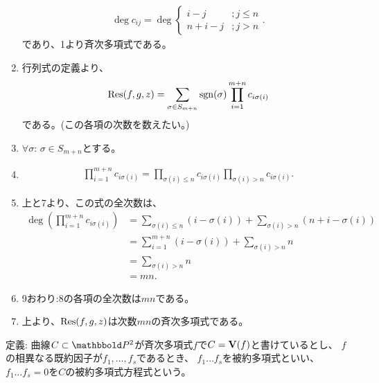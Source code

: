 \begin{myproof}
\begin{enumerate}
\begin{align}
      \deg c_{ij} =  \deg
      \begin{cases}
        i-j &; j \le n\\
        n+i-j &; j>n
      \end{cases}.
    \end{align}
    であり、1より斉次多項式である。
    \item
    行列式の定義より、
    \begin{align}
      \mathrm{Res}(f,g,z) = \sum_{\sigma \in S_{m+n}} \mathrm{sgn}(\sigma) \prod_{i=1}^{m+n}c_{i\sigma(i)}
    \end{align}
    である。(この各項の次数を数えたい。)
    \item $\forall \sigma$: $\sigma \in S_{m+n}$とする。
    \item
    \begin{align}
      \prod_{i=1}^{m+n} c_{i\sigma(i)} =
      \prod_{\sigma(i)\le n}c_{i\sigma(i)}\prod_{\sigma(i)>n}c_{i\sigma(i)}.
    \end{align}
    \item
    上と7より、この式の全次数は、
    \begin{align}
      \deg(\prod_{i=1}^{m+n} c_{i\sigma(i)})
      &=
      \sum_{\sigma(i)\le n}(i-\sigma(i)) + \sum_{\sigma(i)>n} (n+i-\sigma(i))\\
      &=
      \sum_{i=1}^{m+n}(i-\sigma(i)) + \sum_{\sigma(i)>n}n\\
      &=
      \sum_{\sigma(i)>n}n\\
      &=
      mn.
    \end{align}
    \item
    9おわり:8の各項の全次数は$mn$である。
    \item
    上より、$\mathrm{Res}(f,g,z)$は次数$mn$の斉次多項式である。
  \end{enumerate}
\end{myproof}

\begin{framed}
  定義:
  曲線$C\subset \P^2$が斉次多項式$f$で$C=\textbf V(f)$と書けているとし、
  $f$の相異なる既約因子が$f_1,\dots,f_s$であるとき、
  $f_1\dots f_s$を被約多項式といい、$f_1\dots f_s = 0$を$C$の被約多項式方程式という。
\end{framed}

